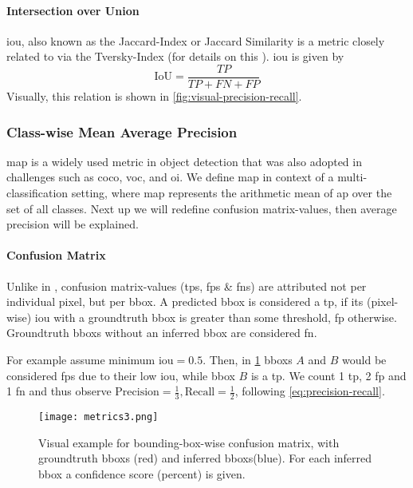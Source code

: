 \paragraph{Intersection over Union}\label{par:iou}
\Gls{iou}, also known as the Jaccard-Index or Jaccard Similarity is a metric
closely related to  via the Tversky-Index (for details on
this \cite[cf.][Section 6.3 Similarity Measures]{James.2011}). \Gls{iou} is 
given by
\begin{equation}
    \text{IoU}=\frac{TP}{TP + FN + FP}
\end{equation}
Visually, this relation is shown in \cref{fig:visual-precision-recall}.

\subsubsection{Class-wise Mean Average Precision}\label{subsect:mAP}
\Gls{map} is a widely used metric in object detection that was also adopted in
challenges such as \gls{coco}, \gls{voc}, and \gls{oi}. We define \gls{map} in
context of a multi-classification setting, where \gls{map} represents the
arithmetic mean of \gls{ap} over the set of all classes. Next up we will
redefine confusion matrix-values, then average precision will be explained.

\paragraph{Confusion Matrix}
Unlike in , confusion matrix-values
(\glspl{tp}, \glspl{fp} \& \glspl{fn}) are attributed not per individual pixel,
but per \gls{bbox}. A predicted \gls{bbox} is considered a \gls{tp}, if its
(pixel-wise) \gls{iou} with a groundtruth \gls{bbox} is greater than some
threshold, \gls{fp} otherwise. Groundtruth \glspl{bbox} without an inferred
\gls{bbox} are considered \gls{fn}.
\par
For example assume minimum \gls{iou}\(=0.5\). Then, in
\cref{fig:bbox-precision-recall} \glspl{bbox} \(A\) and \(B\) would be considered
\glspl{fp} due to their low \gls{iou}, while \gls{bbox} \(B\) is a \gls{tp}.
We count 1 \gls{tp}, 2 \gls{fp} and 1 \gls{fn} and thus observe
\(\text{Precision} = \frac{1}{3}, \text{Recall} = \frac{1}{2}\), following
\cref{eq:precision-recall}.

\begin{figure}
    \center
    \texttt{[image: metrics3.png]}
    \caption{Visual example for bounding-box-wise confusion matrix, with
    groundtruth \glspl{bbox} (red) and inferred \glspl{bbox}(blue). For each
    inferred \gls{bbox} a confidence score (percent) is given.}\label{fig:bbox-precision-recall}
\end{figure}

